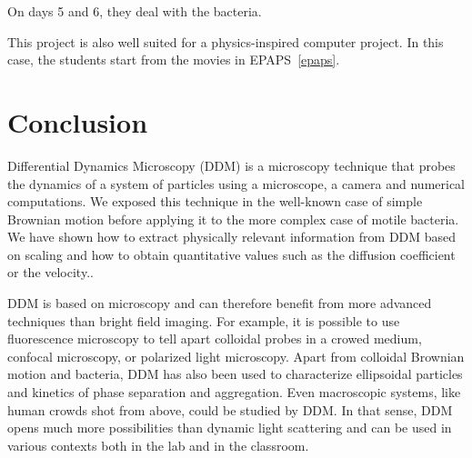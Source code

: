 \documentclass[%
 aip,
 jmp,%
 amsmath,amssymb,
reprint,%
]{revtex4-1}
\begin{document}
On days 5 and 6, they deal with the bacteria. 

This project is also well suited for a physics-inspired computer project. In this case, the students start from the movies in EPAPS~\ref{epaps}.





\section{\label{cl}Conclusion}

Differential Dynamics Microscopy (DDM) is a microscopy technique that probes the dynamics of a system of particles using a microscope, a camera and numerical computations. We exposed this technique in the well-known case of simple Brownian motion before applying it to the more complex case of motile bacteria. We have shown how to extract physically relevant information from DDM based on scaling and how to obtain quantitative values such as the diffusion coefficient or the velocity..

DDM is based  on microscopy and can therefore benefit from  more advanced techniques than bright field imaging. For example, it is possible to use fluorescence microscopy to tell apart colloidal probes in a crowed medium\cite{Hendricks2015}, confocal microscopy\cite{Lu2012}, or polarized light microscopy\citep{20_reufer2012differential}. Apart from colloidal Brownian motion and bacteria, DDM has also been used to characterize ellipsoidal particles\citep{20_reufer2012differential} and kinetics of phase separation\cite{Gao2015} and aggregation\cite{Ferri2011}. Even macroscopic systems, like human crowds shot from above, could be studied by DDM. In that sense, DDM opens much more possibilities than dynamic light scattering and can be used in various contexts both in the lab and in the classroom.
\end{document}
